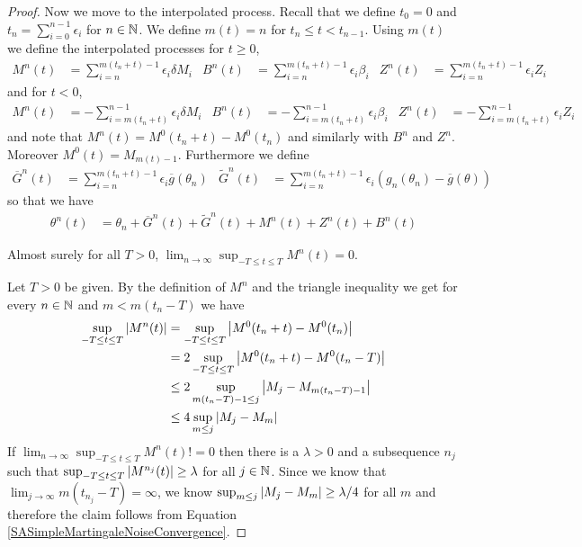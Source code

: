 \begin{proof}
Now we move to the interpolated process.  Recall that we define $t_0 = 0$ and $t_n = \sum_{i=0}^{n-1} \epsilon_i$ for $n \in \mathbb{N}$.  We define $m(t) = n$ for $t_n \leq t < t_{n-1}$.  Using $m(t)$ we define the interpolated processes for $t \geq 0$,
\begin{align*}
M^n(t) &= \sum_{i=n}^{m(t_n + t)-1} \epsilon_i \delta M_i &  
B^n(t) &=\sum_{i=n}^{m(t_n + t)-1} \epsilon_i \beta_i &
Z^n(t) &= \sum_{i=n}^{m(t_n + t)-1} \epsilon_i Z_i
\end{align*}
and for $t < 0$,
\begin{align*}
M^n(t) &= - \sum_{i=m(t_n + t)}^{n-1} \epsilon_i \delta M_i &  
B^n(t) &= - \sum_{i=m(t_n + t)}^{n-1} \epsilon_i \beta_i &  
Z^n(t) &= - \sum_{i=m(t_n + t)}^{n-1} \epsilon_i Z_i &  
\end{align*}
and note that $M^n(t) = M^0(t_n+t) - M^0(t_n)$ and similarly with $B^n$ and $Z^n$.  Moreover
$M^0(t) = M_{m(t) -1}$.
Furthermore we define
\begin{align*}
\overline{G}^n(t) &= \sum_{i=n}^{m(t_n + t)-1} \epsilon_i \overline{g}(\theta_n) &  
\tilde{G}^n(t) &=\sum_{i=n}^{m(t_n + t)-1} \epsilon_i \left( g_n(\theta_n) - \overline{g}(\theta) \right )&
\end{align*}
so that we have 
\begin{align*}
\theta^n(t) &= \theta_n + \overline{G}^n(t)  + \tilde{G}^n(t) + M^n(t) + Z^n(t)  + B^n(t) 
\end{align*}

\begin{clm}Almost surely for all $T > 0$, $\lim_{n \to \infty} \sup_{-T \leq t \leq T} M^n(t) = 0$.
\end{clm}

Let $T > 0$ be given.  By the definition of $M^n$ and the triangle inequality we get for every $n \in \mathbb{N}$ and $m < m(t_n -T)$ we have
\begin{align*}
\sup_{-T \leq t \leq T} \left \vert M^n (t) \right \vert  
&=\sup_{-T \leq t \leq T} \left \vert M^0 (t_n + t) - M^0(t_n) \right \vert  \\
&=2 \sup_{-T \leq t \leq T} \left \vert M^0 (t_n + t) - M^0(t_n -T ) \right \vert \\  
&\leq 2 \sup_{m(t_n-T) - 1 \leq j}  \left \vert M_j - M_{m(t_n -T )-1} \right \vert\\
&\leq 4 \sup_{m \leq j}  \left \vert M_j - M_{m} \right \vert\\
\end{align*}
If $\lim_{n \to \infty} \sup_{-T \leq t \leq T} M^n (t) != 0$ then there is a $\lambda>0$ and a subsequence $n_j$such that $\sup_{-T \leq t \leq T} \left \vert M^{n_j} (t) \right \vert \geq \lambda$ for all $j \in \mathbb{N}$.  Since we know that $\lim_{j \to \infty} m(t_{n_j} -T) = \infty$, we know $\sup_{m \leq j}  \left \vert M_j - M_{m} \right \vert \geq \lambda/4$ for all $m$ and therefore the claim follows from Equation \eqref{SASimpleMartingaleNoiseConvergence}.  



\end{proof}
